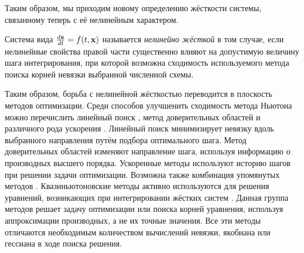 Таким образом, мы приходим новому определению жёсткости системы,
связанному теперь с её нелинейным характером.

\begin{definition}
    \label{def:nonlinear_stiffness}
    Система вида $ \frac{d \mathbf{x}}{d t} = f(t, \mathbf{x}) $ называется \emph{нелинейно жёсткой} в том случае,
    если нелинейные свойства правой части существенно влияют на допустимую величину шага интегрирования,
    при которой возможна сходимость используемого метода поиска корней невязки выбранной численной схемы.
\end{definition}

Таким образом, борьба с нелинейной жёсткостью переводится в плоскость методов оптимизации.
Среди способов улучшенить сходимость метода Ньютона можно перечислить линейный поиск \cite{armijo1966minimization, wolfe1969convergence},
метод доверительных областей \cite{sorensen1982newton} и различного рода ускорения \cite{anderson1965iterative, nesterov27method, brown1994convergence}.
Линейный поиск минимизирует невязку вдоль выбранного направления путём подбора оптимального шага.
Метод доверительных областей изменяют направление шага, используя информацию о производных высшего порядка.
Ускоренные методы используют историю шагов при решении задачи оптимизации.
Возможна также комбинация упомянутых методов \cite{brune2015composing}.
Квазиньютоновские методы активно используются для решения уравнений, возникающих при интегрировании жёстких систем
\cite{brown1985experiments, alexander1991modified, moore1994stepsize, schlenkrich2006application}.
Данная группа методов решает задачу оптимизации или поиска корней уравнения, используя аппроксимации производных, а не их точные значения.
Все эти методы отличаются необходимым количеством вычислений невязки, якобиана или гессиана в ходе поиска решения.
